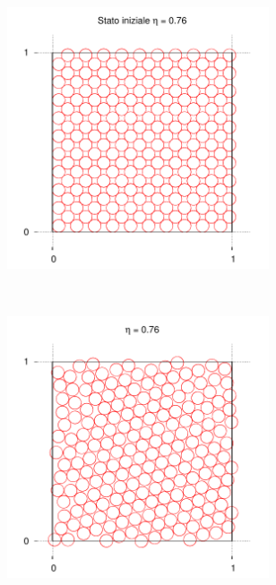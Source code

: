 \documentclass[11pt]{article}
\theoremstyle{plain}
\theoremstyle{remark}
\begin{document}
\begin{figure}[htbp]
		\caption[Sfere Rigide$/$Preliminari\_Snap2D.cpp]{Immagini del sistema 2D termalizzato a diversi valori di impacchettamento. (In alto a sinistra è visibile la configurazione inziale prima dell'evoluzione temporale).}	\vspace{-15pt}
        \begin{subfigure}[b]{0.5\textwidth}
                \centering
                \includegraphics[width=0.85\textwidth]{Immagini/Rigide/SnapInizio_2D}
        \end{subfigure}%
        ~ %
        \begin{subfigure}[b]{0.5\textwidth}
                \centering
                \includegraphics[width=0.85\textwidth]{Immagini/Rigide/SnapSolido_2D}
        \end{subfigure}
        ~ %
\vspace{-15pt}


\end{figure}
\end{document}
